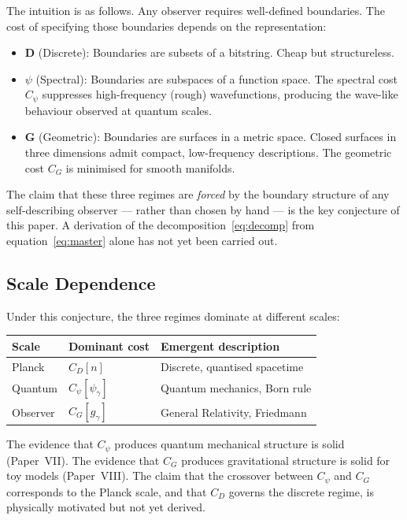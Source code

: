 \documentclass[11pt]{article}
\begin{document}
The intuition is as follows.
Any observer requires well-defined boundaries.
The cost of specifying those boundaries depends on the representation:

\begin{itemize}
  \item \textbf{D} (Discrete): Boundaries are subsets of a bitstring.
        Cheap but structureless.
  \item \textbf{$\psi$} (Spectral): Boundaries are subspaces of a
        function space.
        The spectral cost $C_\psi$ suppresses high-frequency
        (rough) wavefunctions, producing the wave-like behaviour
        observed at quantum scales.
  \item \textbf{G} (Geometric): Boundaries are surfaces in a metric
        space.
        Closed surfaces in three dimensions admit compact,
        low-frequency descriptions.
        The geometric cost $C_G$ is minimised for smooth manifolds.
\end{itemize}

The claim that these three regimes are \emph{forced} by the boundary
structure of any self-describing observer --- rather than chosen by
hand --- is the key conjecture of this paper.
A derivation of the decomposition~\eqref{eq:decomp} from
equation~\eqref{eq:master} alone has not yet been carried out.

\subsection{Scale Dependence}

Under this conjecture, the three regimes dominate at different scales:

\begin{center}
\begin{tabular}{lll}
\hline
\textbf{Scale} & \textbf{Dominant cost} & \textbf{Emergent description} \\
\hline
Planck & $C_D[n]$ & Discrete, quantised spacetime \\
Quantum & $C_\psi[\psi_\gamma]$ & Quantum mechanics, Born rule \\
Observer & $C_G[g_\gamma]$ & General Relativity, Friedmann \\
\hline
\end{tabular}
\end{center}

The evidence that $C_\psi$ produces quantum mechanical structure is
solid (Paper~VII).
The evidence that $C_G$ produces gravitational structure is solid for
toy models (Paper~VIII).
The claim that the crossover between $C_\psi$ and $C_G$ corresponds
to the Planck scale, and that $C_D$ governs the discrete regime, is
physically motivated but not yet derived.
\end{document}
